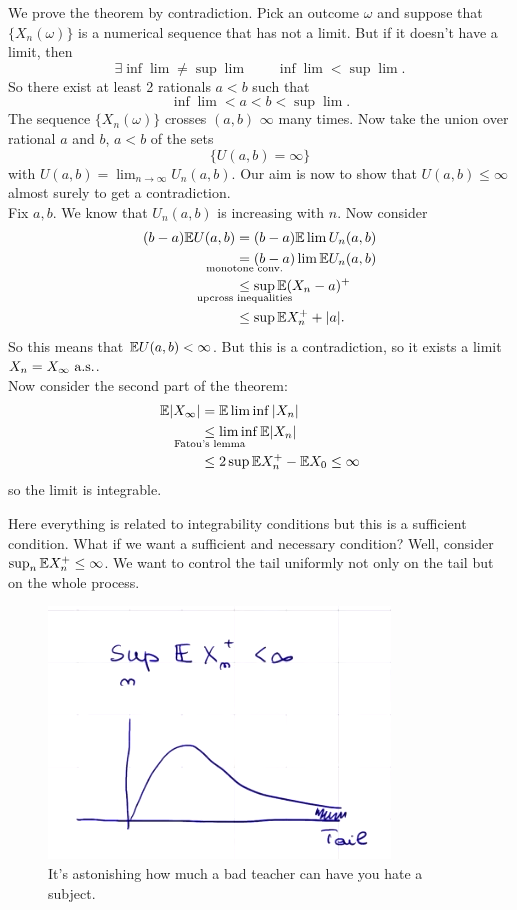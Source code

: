 \documentclass{report}
\begin{document}
\begin{fancyproof}
	We prove the theorem by contradiction. Pick an outcome $\omega$ and suppose that $\{X_{n}(\omega)\}$ is a numerical sequence that has not a limit. But if it doesn't have a limit, then 
	\[\exists\inf\lim\neq\sup\lim\qquad\inf\lim<\sup\lim.\]
	So there exist at least 2 rationals $a<b$ such that
	\begin{equation*}
		\inf\lim<a<b<\sup\lim.
	\end{equation*}
	The sequence $\{X_{n}(\omega)\}$ crosses $(a,b)$ $\infty$ many times. Now take the union over rational $a$ and $b$, $a<b$ of the sets
	\begin{equation*}
		\{U(a,b)=\infty\}
	\end{equation*}
	with $U(a,b)=\lim_{n\to\infty}U_{n}(a,b)$. Our aim is now to show that $U(a,b)\leq\infty$ almost surely to get a contradiction.\\
	Fix $a,b$. We know that $U_{n}(a,b)$ is increasing with $n$. Now consider
	\begin{align*}
		(b-a)\ev U(a,b)&=(b-a)\ev\lim U_{n}(a,b)\\
		&\underset{\mathclap{\text{monotone conv.}}}{=}(b-a)\lim\ev U_{n}(a,b)\\
		&\underset{\mathclap{\text{upcross inequalities}}}{\leq}\sup\ev(X_n-a)^{+}\\
		&\leq \sup\ev X_{n}^{+}+|a|.
	\end{align*}
	So this means that $\mathbb{E} U(a,b)<\infty$. But this is a contradiction, so it exists a limit $X_{n}=X_{\infty}\text{ a.s.}$.\\
	Now consider the second part of the theorem:
	\begin{align*}
		\ev|X_{\infty}|&=\ev\lim\inf|X_{n}|\\
		&\underset{\mathclap{\text{Fatou's lemma}}}{\leq}\lim\inf\ev|X_{n}|\\
		&\leq 2\sup\ev X_{n}^{+}-\ev X_{0}\leq\infty
	\end{align*}
	so the limit is integrable.
\end{fancyproof}
Here everything is related to integrability conditions but this is a sufficient condition. What if we want a sufficient and necessary condition? Well, consider $\sup_n\mathbb{E} X_{n}^{+}\leq\infty$. We want to control the tail uniformly not only on the tail but on the whole process.
\begin{figure}[h]
	\centering
	\includegraphics[width=0.6\linewidth]{screenshot020}
	\caption{It's astonishing how much a bad teacher can have you hate a subject.}
	\label{fig:screenshot020}
\end{figure}
\end{document}
